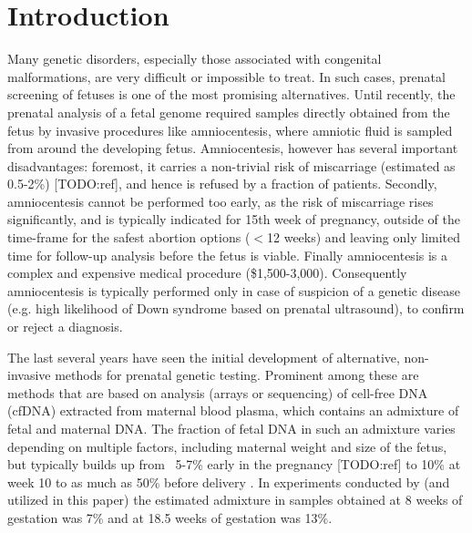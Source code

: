 \section{Introduction}

Many genetic disorders, especially those associated with congenital malformations, are very difficult or impossible to treat. In such cases, prenatal screening of fetuses is one of the most promising alternatives. 
Until recently, the prenatal analysis of a fetal genome required samples directly obtained from the fetus by invasive procedures like amniocentesis, where amniotic fluid is sampled from around the developing fetus.
Amniocentesis, however has several important disadvantages: foremost, it carries a non-trivial risk of miscarriage (estimated as 0.5-2\%) [TODO:ref], and hence is refused by a fraction of patients. Secondly, amniocentesis cannot be performed too early, as the risk of miscarriage rises significantly, and is typically indicated for 15th week of pregnancy, outside of the time-frame for the safest abortion options ($<$12 weeks) and leaving only limited time for follow-up analysis before the fetus is viable. Finally amniocentesis is a complex and expensive medical procedure (\$1,500-3,000). Consequently amniocentesis is typically performed only in case of suspicion of a genetic disease (e.g. high likelihood of Down syndrome based on prenatal ultrasound), to confirm or reject a diagnosis. 

The last several years have seen the initial development of alternative, non-invasive methods for prenatal genetic testing. Prominent among these are methods that are based on analysis (arrays or sequencing) of  cell-free DNA (cfDNA) extracted from maternal blood plasma, which contains an admixture of fetal and maternal DNA. The fraction of fetal DNA in such an admixture varies depending on multiple factors, including maternal weight and size of the fetus, but typically builds up from ~5-7\% early in the pregnancy [TODO:ref] to 10\% at week 10 \cite{wang2013} to as much as 50\% before delivery \cite{wang2013, fan2012}. In experiments conducted by \cite{kitzman2012} (and utilized in this paper) the estimated admixture in samples obtained at 8 weeks of gestation was 7\% and at 18.5 weeks of gestation was 13\%. 

